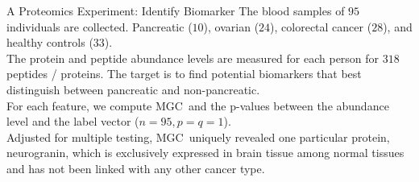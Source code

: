 \documentclass[mathserif,t]{beamer}
\newcommand{\Mgc}{MGC}
\begin{document}
\begin{frame}{A Proteomics Experiment: Identify Biomarker}
\pause
The blood samples of $95$ individuals are collected. Pancreatic ($10$), ovarian ($24$), colorectal cancer ($28$), and healthy controls ($33$). \\

\pause
\medskip
The protein and peptide abundance levels are measured for each person for $318$ peptides / proteins. 
\pause
The target is to find potential biomarkers that best distinguish between pancreatic and non-pancreatic.\\

\pause
\medskip
For each feature, we compute \Mgc~and the p-values between the abundance level and the label vector ($n=95, p=q=1$).\\

\pause
\medskip
Adjusted for multiple testing, \Mgc~uniquely revealed one particular protein, neurogranin, which is exclusively expressed in brain tissue among normal tissues and has not been linked with any other cancer type. \\

\end{frame}

\end{document}
